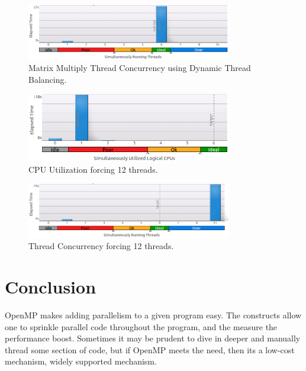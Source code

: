 \documentclass[journal,10pt,onecolumn,draftcls]{IEEEtran}
\begin{document}
\begin{figure}[!t]
\begin{center}
\includegraphics[width=0.8\textwidth]{figures/matrix_dynamic_schedule_thread_concurrency.png}
\caption{Matrix Multiply Thread Concurrency using Dynamic Thread Balancing.}
\label{fig:matrix_dynamic_schedule_concurrency}
\end{center}
\end{figure}



\begin{figure}[!t]
\begin{center}
\includegraphics[width=0.8\textwidth]{figures/12_threaded_matrix_thread_cpu_usage_histogram.png}
\caption{CPU Utilization forcing 12 threads.}
\label{fig:12_threaded_matrix_cpu_usage}
\end{center}
\end{figure}

\begin{figure}[!t]
\begin{center}
\includegraphics[width=0.8\textwidth]{figures/12_threaded_matrix_thread_concurrent_histogram.png}
\caption{Thread Concurrency forcing 12 threads.}
\label{fig:12_threaded_matrix_concurrent}
\end{center}
\end{figure}


\section{Conclusion}
OpenMP makes adding parallelism to a given program easy. The constructs allow one to sprinkle
parallel code throughout the program, and the measure the performance boost. Sometimes it
may be prudent to dive in deeper and manually thread some section of code, but if OpenMP
meets the need, then its a low-cost mechanism, widely supported mechanism.
\end{document}
